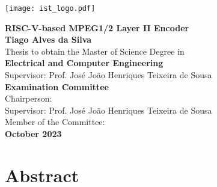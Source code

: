 \documentclass[10pt]{esda}
\title{}
\author{}
\date{}
\begin{document}
\texttt{[image: ist\_logo.pdf]}

\thispagestyle{empty}

\begin{onehalfspace}

\begin{center}
\begin{Large}
  \vspace{4cm}
  {\bf \Large {RISC-V-based MPEG1/2 Layer II Encoder}}\\
  \vspace{2.5cm}
  {\bf \Large Tiago Alves da Silva}\\
  \vspace{2cm}
  \Large {Thesis to obtain the Master of Science Degree in}\\
  \vspace{2mm}
  {\bf \Large {Electrical and Computer Engineering}}\\
  \vspace{2cm}
  \Large {Supervisor: Prof. José João Henriques Teixeira de Sousa}\\
  \vspace{1.5cm}
  {\bf \Large Examination Committee}\\
  \Large {Chairperson: }\\
  \Large {Supervisor: Prof. José João Henriques Teixeira de Sousa}\\
  \Large {Member of the Committee: }\\

  \vspace{2cm}
  {\bf \Large October 2023 }
\end{Large}
\end{center}

\end{onehalfspace}


\cleardoublepage

\section*{Abstract}

\end{document}
